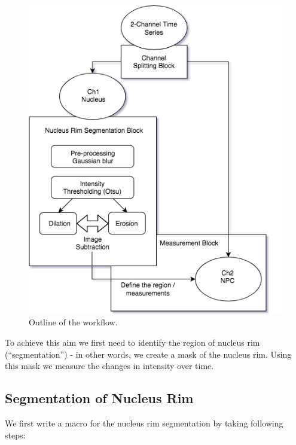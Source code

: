 \begin{figure}[H]
\begin{center}
\includegraphics[scale=0.9]{fig/nucrimMeasurementsDiagram.png}
\caption{Outline of the workflow.}
\label{fig:outline}
\end{center}
\end{figure}

To achieve this aim we first need to identify the region of nucleus rim (``segmentation'') - in other words, we create a mask of the nucleus rim. Using this mask we measure the changes in intensity over time. 

\subsection{Segmentation of Nucleus Rim}

We first write a macro for the nucleus rim segmentation by taking following steps:  

